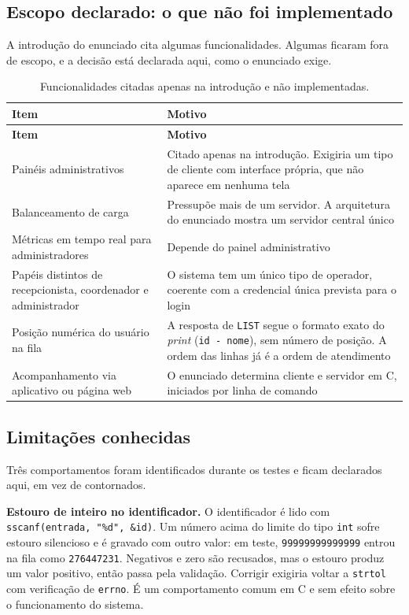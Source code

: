 \documentclass[12pt,a4paper]{article}
\begin{document}
\subsection{Escopo declarado: o que não foi implementado}

A introdução do enunciado cita algumas funcionalidades. Algumas ficaram fora de
escopo, e a decisão está declarada aqui, como o enunciado exige.

{\footnotesize
\begin{longtable}{L{4.6cm} L{8.6cm}}
\caption{Funcionalidades citadas apenas na introdução e não implementadas.}\\
\toprule
\textbf{Item} & \textbf{Motivo} \\
\midrule
\endfirsthead
\toprule
\textbf{Item} & \textbf{Motivo} \\
\midrule
\endhead
Painéis administrativos &
Citado apenas na introdução. Exigiria um tipo de cliente com interface própria,
que não aparece em nenhuma tela \\
\addlinespace
Balanceamento de carga &
Pressupõe mais de um servidor. A arquitetura do enunciado mostra um servidor
central único \\
\addlinespace
Métricas em tempo real para administradores &
Depende do painel administrativo \\
\addlinespace
Papéis distintos de recepcionista, coordenador e administrador &
O sistema tem um único tipo de operador, coerente com a credencial única
prevista para o login \\
\addlinespace
Posição numérica do usuário na fila &
A resposta de \texttt{LIST} segue o formato exato do \textit{print}
(\texttt{id - nome}), sem número de posição. A ordem das linhas já é a ordem de
atendimento \\
\addlinespace
Acompanhamento via aplicativo ou página web &
O enunciado determina cliente e servidor em C, iniciados por linha de comando \\
\bottomrule
\end{longtable}}

\subsection{Limitações conhecidas}

Três comportamentos foram identificados durante os testes e ficam declarados
aqui, em vez de contornados.

\vspace{6pt}
\noindent\textbf{Estouro de inteiro no identificador.} O identificador é lido com
\texttt{sscanf(entrada, "\%d", \&id)}. Um número acima do limite do tipo
\texttt{int} sofre estouro silencioso e é gravado com outro valor: em teste,
\texttt{99999999999999} entrou na fila como \texttt{276447231}. Negativos e zero
são recusados, mas o estouro produz um valor positivo, então passa pela
validação. Corrigir exigiria voltar a \texttt{strtol} com verificação de
\texttt{errno}. É um comportamento comum em C e sem efeito sobre o funcionamento
do sistema.
\end{document}
